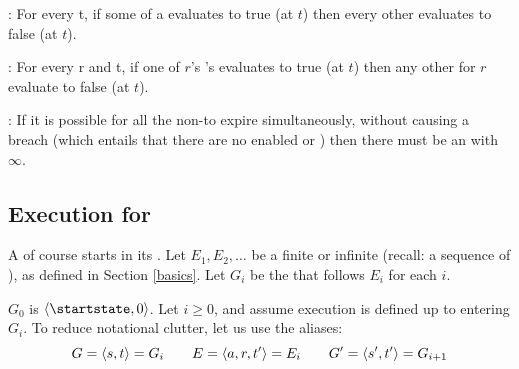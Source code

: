 \documentclass[12pt]{article}
\begin{document}
\noindent {}: For every \TimeStamp t, if some \TGuard of a \mustntran evaluates to true (at $t$) then every other \TGuard evaluates to false (at $t$).
\medskip

\noindent {}: For every \Role r and \TimeStamp t, if one of $r$'s \rmustntrans's \TGuards evaluates to true (at $t$) then any other \rmustntrans for $r$ evaluate to false (at $t$).
\medskip

\noindent {}: If it is possible for all the \enabled non-\Env \transitions to expire simultaneously, without causing a breach (which entails that there are no enabled \mustntrans or \rmustntrans) then there must be an \depTrans{\Env} with \Deadline $\infty$.
\smallskip



%


\subsection{Execution for \FSContracts} \label{fscontractexec}
A \FSContract of course starts in its \startstate. Let $E_1, E_2, \dots$ be a finite or infinite \trace (recall: a sequence of \Events), as defined in Section \ref{basics}. Let $G_i$ be the \GlobalState that follows $E_i$ for each $i$.

$G_0$ is $\tup{\startstate, 0}$.
Let $i \geq 0$, and assume execution is defined up to entering $G_i$. To reduce notational clutter, let us use the aliases:
\[ G = \langle s,t\rangle = G_i  \qquad E = \langle a,r,t'\rangle = E_i \qquad  G' = \langle s',t'\rangle = G_{i+1}\]
\end{document}
